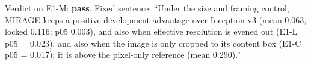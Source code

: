 Verdict on E1-M: \textbf{pass}. Fixed sentence: ``Under the size and framing control, MIRAGE keeps a positive development advantage over Inception-v3 (mean 0.063, locked 0.116; p05 0.003), and also when effective resolution is evened out (E1-L p05 = 0.023), and also when the image is only cropped to its content box (E1-C p05 = 0.017); it is above the pixel-only reference (mean 0.290).''
